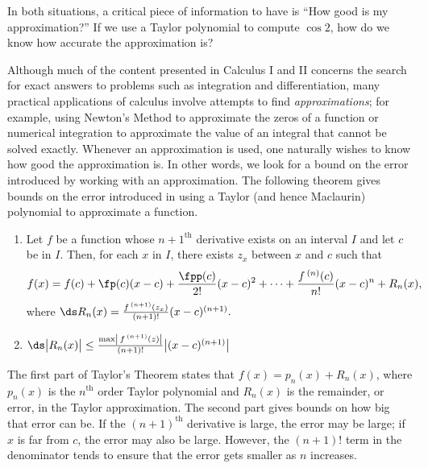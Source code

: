 	
In both situations, a critical piece of information to have is ``How good is my approximation?'' If we use a Taylor polynomial to compute $\cos 2$, how do we know how accurate the approximation is? 

Although much of the content presented in Calculus I and II concerns the search for exact answers to problems such as integration and differentiation, many practical applications of calculus involve attempts to find \textit{approximations}; for example, using Newton's Method to approximate the zeros of a function or numerical integration to approximate the value of an integral that cannot be solved exactly. Whenever an approximation is used, one naturally wishes to know how good the approximation is. In other words, we look for a bound on the error introduced by working with an approximation. The following theorem gives bounds on the error introduced in using a Taylor (and hence Maclaurin) polynomial to approximate a function.

\setboxwidth{65pt}
{\begin{enumerate}
\item	Let $f$ be a function whose $n+1^\text{th}$ derivative exists on an interval $I$ and let $c$ be in $I$. Then, for each $x$ in $I$, there exists $z_x$ between $x$ and $c$ such that
$$f(x) = f(c) + \fp(c)(x-c) + \frac{\fpp(c)}{2!}(x-c)^2+ \cdots +\frac{f\,^{(n)}(c)}{n!}(x-c)^n+R_n(x),$$
where $\ds R_n(x) = \frac{f\,^{(n+1)}(z_x)}{(n+1)!}(x-c)^{(n+1)}.$

\item		$\ds \big|R_n(x)\big| \leq \frac{\max\left|\,f\,^{(n+1)}(z)\right|}{(n+1)!}\big|(x-c)^{(n+1)}\big|$
\end{enumerate}
}
\restoreboxwidth

The first part of Taylor's Theorem states that $f(x) = p_n(x) + R_n(x)$, where $p_n(x)$ is the $n^\text{th}$ order Taylor polynomial and $R_n(x)$ is the remainder, or error, in the Taylor approximation. The second part gives bounds on how big that error can be. If the $(n+1)^\text{th}$ derivative is large, the error may be large; if $x$ is far from $c$, the error may also be large. However, the $(n+1)!$ term in the denominator tends to ensure that the error gets smaller as $n$ increases.

